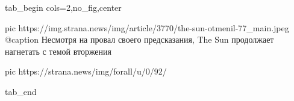  
 
 
 
 


\ifcmt
  tab_begin cols=2,no_fig,center

     pic https://img.strana.news/img/article/3770/the-sun-otmenil-77_main.jpeg
		 @caption Несмотря на провал своего предсказания, The Sun продолжает нагнетать с темой вторжения 

		 pic https://strana.news/img/forall/u/0/92/%

  tab_end
\fi
